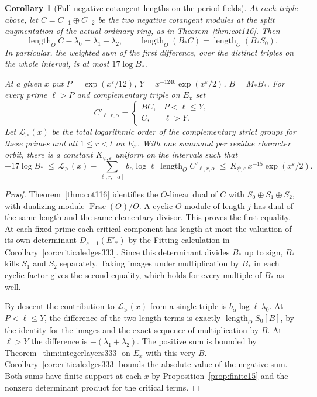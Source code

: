 \documentclass[a4paper,11pt]{article}
\newtheorem{corollary}[proposition]{Corollary}
\theoremstyle{definition}
\theoremstyle{remark}
\newcommand{\len}{\operatorname{length}}\newcommand{\Res}{\operatorname*{Res}}
\numberwithin{equation}{section}
\begin{document}
\begin{corollary}[Full negative cotangent lengths on the period fields]
\label{cor:midtangent333}
At each triple above, let \(C=C_{-1}\oplus C_{-2}\) be the two
negative cotangent modules at the split augmentation of the actual
ordinary ring, as in Theorem~\ref{thm:cot116}. Then
\[
       \len_O C-\lambda_0=\lambda_1+\lambda_2,\qquad
       \len_O(B_*C)=\len_O(B_* S_0).
\]
In particular, the weighted sum of the first difference, over the
distinct triples on the whole interval, is at most \(17\log B_*\).

At a given \(x\) put \(P=\exp(x^\varepsilon/12)\),
\(Y=x^{-1240}\exp(x^\varepsilon/2)\), \(B=M_*B_*\).
For every prime \(\ell>P\) and complementary triple on \(E_x\) set
\[
 C'_{\ell,r,\alpha}=
       \begin{cases} B C,&P<\ell\le Y,\\ C,&\ell>Y.\end{cases}
\]
Let \(\mathcal L_{>}(x)\) be the total logarithmic order of the
complementary strict groups for these primes and all \(1\le r<t\)
on \(E_x\). With one summand per residue character orbit, there is
a constant \(K_{\psi,\varepsilon}\) uniform on the intervals such that
\[
 -17\log B_*
 \ \le\ \mathcal L_{>}(x)-
     \sum_{\ell,r,[\alpha]} b_\alpha\log\ell\,\len_O C'_{\ell,r,\alpha}
 \ \le\ K_{\psi,\varepsilon}\,x^{-15}\exp(x^\varepsilon/2).
\]
\end{corollary}
\begin{proof}
Theorem~\ref{thm:cot116} identifies the \(O\)-linear dual of \(C\)
with \(S_0\oplus S_1\oplus S_2\), with dualizing module
\(\operatorname{Frac}(O)/O\). A cyclic \(O\)-module of length \(j\)
has dual of the same length and the same elementary divisor.
This proves the first equality. At each fixed prime each critical
component has length at most the valuation of its own determinant
\(D_{s+1}(E'_*)\) by the Fitting calculation in
Corollary~\ref{cor:criticaledges333}. Since this determinant divides
\(B_*\) up to sign, \(B_*\) kills \(S_1\) and \(S_2\) separately.
Taking images under multiplication by \(B_*\) in each cyclic factor
gives the second equality, which holds for every multiple of \(B_*\)
as well.

By descent the contribution to \(\mathcal L_{>}(x)\) from a single
triple is \(b_\alpha\log\ell\,\lambda_0\).
At \(P<\ell\le Y\), the difference of the two length terms is exactly
\(\len_O S_0[B]\), by the identity for the images and the exact
sequence of multiplication by \(B\). At \(\ell>Y\) the difference
is \(-(\lambda_1+\lambda_2)\). The positive sum is bounded by
Theorem~\ref{thm:integerlayers333} on \(E_x\) with this very \(B\).
Corollary~\ref{cor:criticaledges333} bounds the absolute value
of the negative sum. Both sums have finite support at each \(x\)
by Proposition~\ref{prop:finite15} and the nonzero determinant
product for the critical terms.
\end{proof}
\end{document}
